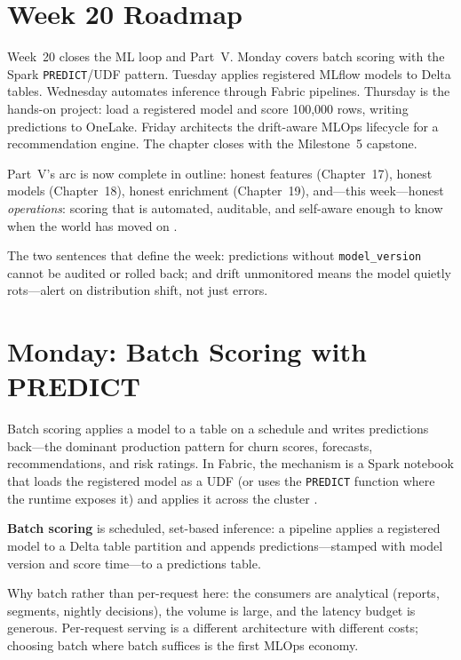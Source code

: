 \section{Week 20 Roadmap}
Week~20 closes the ML loop and Part~V. Monday covers batch scoring with the Spark \texttt{PREDICT}/UDF pattern. Tuesday applies registered MLflow models to Delta tables. Wednesday automates inference through Fabric pipelines. Thursday is the hands-on project: load a registered model and score 100,000 rows, writing predictions to OneLake. Friday architects the drift-aware MLOps lifecycle for a recommendation engine. The chapter closes with the Milestone~5 capstone.

Part~V's arc is now complete in outline: honest features (Chapter~17), honest models (Chapter~18), honest enrichment (Chapter~19), and---this week---honest \emph{operations}: scoring that is automated, auditable, and self-aware enough to know when the world has moved on \cite{microsoftFabricMlTraining,mlflowDocs}.

\begin{notebox}
The two sentences that define the week: predictions without \texttt{model\_version} cannot be audited or rolled back; and drift unmonitored means the model quietly rots---alert on distribution shift, not just errors.
\end{notebox}

\section{Monday: Batch Scoring with PREDICT}
Batch scoring applies a model to a table on a schedule and writes predictions back---the dominant production pattern for churn scores, forecasts, recommendations, and risk ratings. In Fabric, the mechanism is a Spark notebook that loads the registered model as a UDF (or uses the \texttt{PREDICT} function where the runtime exposes it) and applies it across the cluster \cite{microsoftFabricMlTraining,microsoftFabricSparkCompute}.

\begin{definitionbox}
\textbf{Batch scoring} is scheduled, set-based inference: a pipeline applies a registered model to a Delta table partition and appends predictions---stamped with model version and score time---to a predictions table.
\end{definitionbox}

Why batch rather than per-request here: the consumers are analytical (reports, segments, nightly decisions), the volume is large, and the latency budget is generous. Per-request serving is a different architecture with different costs; choosing batch where batch suffices is the first MLOps economy.

